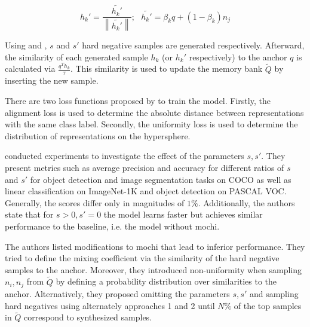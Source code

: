 \begin{equation}
    h_k' = \frac{\tilde{h_k'}}{\left\| \tilde{h_k'}  \right\|}; \text{  } \tilde{h_k'} = \beta_k q + (1-\beta_k)n_j
    \label{eq:mochi_appr2}
\end{equation}

Using  and , 
$s$ and $s'$ hard negative samples are generated respectively.
Afterward, the similarity of each generated sample $h_k$ (or $h_k'$ respectively) 
to the anchor $q$ is calculated via $\frac{q^T h_k}{\tau}$.
This similarity is used to update the memory bank $\tilde{Q}$ 
by inserting the new sample.

There are two loss functions proposed by \citet{mochi_2020} to train the model.
Firstly, the alignment loss is used to determine 
the absolute distance between representations with the same class label.
Secondly, the uniformity loss is used to determine 
the distribution of representations on the hypersphere.

\citet{mochi_2020} conducted experiments to investigate the effect of the parameters $s, s'$.
They present metrics such as average precision and accuracy for different ratios of $s$ and $s'$ 
for object detection and image segmentation tasks on COCO as well as 
linear classification on ImageNet-1K and object detection on PASCAL VOC.
Generally, the scores differ only in magnitudes of $1 \%$.
Additionally, the authors state that for $s > 0, s' = 0$ the model learns faster but achieves similar performance to the baseline, i.e. the model without \ac{mochi}.


The authors listed modifications to \ac{mochi} that lead to inferior performance.
They tried to define the mixing coefficient via the similarity of the hard negative samples 
to the anchor. %
Moreover, they introduced non-uniformity when sampling $n_i, n_j$ from $\tilde{Q}$ by defining a 
probability distribution over similarities to the anchor. %
Alternatively, they proposed omitting the parameters $s, s'$ and 
sampling hard negatives using alternately approaches 1 and 2 until $N\%$ of the top samples in 
$\tilde{Q}$ correspond to synthesized samples.

